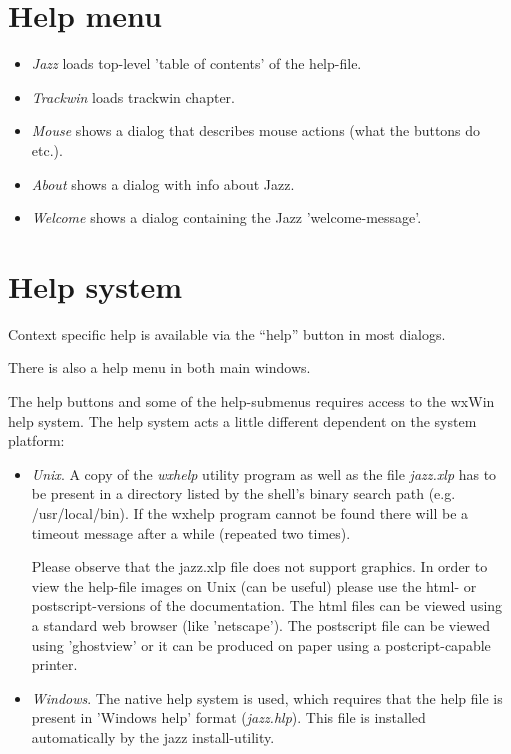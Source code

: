 \documentclass[letterpaper]{report}
\begin{document}
\section{Help menu}\label{twhelp}

\begin{itemize}

\item {\em Jazz} loads top-level 'table of contents' of the help-file.

\item {\em Trackwin} loads trackwin chapter.

\item {\em Mouse} shows a dialog that describes mouse actions (what the buttons do
etc.).

\item {\em About} shows a dialog with info about Jazz.

\item {\em Welcome} shows a dialog containing the Jazz 'welcome-message'.

\end{itemize}

\section{Help system}\label{help}
Context specific help is available via the ``help'' button in most dialogs.

There is also a help menu in both main windows.

The help buttons and some of the help-submenus requires access to
the wxWin help system. The help system acts a little different dependent
on the system platform:

\begin{itemize}
\item {\em Unix}. A copy of the {\em wxhelp} utility program as well as
the file {\em jazz.xlp} has to be present in a directory listed by the
shell's binary search path (e.g. /usr/local/bin). If the wxhelp program
cannot be found there will be a timeout message
after a while (repeated two times).

Please observe that the jazz.xlp file does not support graphics.
In order to view the help-file images on Unix (can be useful)
please use the html- or postscript-versions of the documentation. The html
files can be viewed using a standard web browser (like 'netscape'). The
postscript file can be viewed using 'ghostview' or it can be produced on paper
using a postcript-capable printer.

\item {\em Windows}. The native help system is used, which requires that the
help file is present in 'Windows help' format ({\em jazz.hlp}). This file is
installed automatically by the jazz install-utility.
\end{itemize}
\end{document}
